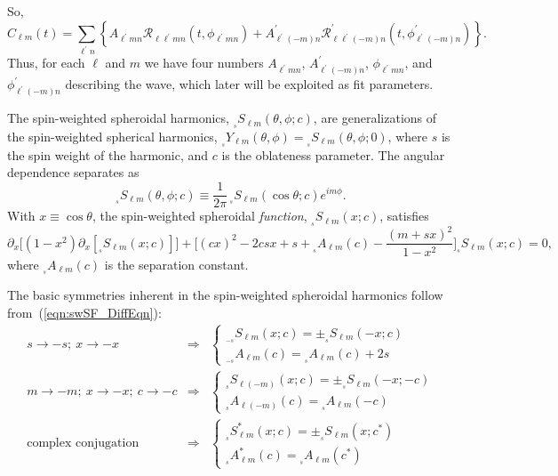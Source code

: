 \documentclass[11pt]{article}
\newcommand{\swY}[4][]{{}_{{}_{#2}}\!Y^{#1}_{#3}(#4)}
\newcommand{\swSH}[5][]{{}_{{}_{#2}}S^{#1}_{#3}(#4;#5)}
\newcommand{\swS}[5][]{{}_{{}_{#2}}S^{#1}_{#3}(#4;#5)}
\newcommand{\scA}[4][]{{}_{{}_{#2}}A^{#1}_{#3}(#4)}
\begin{document}
So,
\begin{equation}
 C_{\ell{m}}(t) = \sum_{\ell^\prime{n}} \left\{ 
   A_{\ell^\prime{m}n}\mathcal{R}_{\ell\ell^\prime{m}n}(t,\phi_{\ell^\prime{m}n})
  + A^\prime_{\ell^\prime(-m)n}
     \mathcal{R}^\prime_{\ell\ell^\prime(-m)n}(t,\phi^\prime_{\ell^\prime(-m)n})
     \right\}.
\end{equation}
Thus, for each $\ell$ and $m$ we have four numbers $A_{\ell^\prime{m}n}$, $A^\prime_{\ell^\prime(-m)n}$, $\phi_{\ell^\prime{m}n}$, and $\phi^\prime_{\ell^\prime(-m)n}$ describing the wave, which later will be exploited as fit parameters.

\newpage
{}
\vspace{0.25in}

The spin-weighted spheroidal harmonics,
$\swSH{s}{\ell{m}}{\theta,\phi}{c}$, are generalizations of the
spin-weighted spherical harmonics,
$\swY{s}{\ell{m}}{\theta,\phi}=\swSH{s}{\ell{m}}{\theta,\phi}{0}$,
where $s$ is the spin weight of the harmonic, and $c$ is the
oblateness parameter.  The angular dependence separates as
\begin{equation}
  \swSH{s}{\ell{m}}{\theta,\phi}{c} \equiv 
  \frac1{2\pi}\,\swS{s}{\ell{m}}{\cos\theta}{c}e^{im\phi}.
\end{equation}
With $x\equiv\cos\theta$, the spin-weighted spheroidal {\em function},
$\swS{s}{\ell{m}}{x}{c}$, satisfies
\begin{equation}\label{eqn:swSF_DiffEqn}
\partial_x \Big[ (1-x^2)\partial_x [\swS{s}{\ell{m}}{x}{c}]\Big] 
    + \bigg[(cx)^2 - 2 csx + s + \scA{s}{\ell m}{c} 
      - \frac{(m+sx)^2}{1-x^2}\bigg]\swS{s}{\ell{m}}{x}{c} = 0,
\end{equation}
where $\scA{s}{\ell m}{c}$ is the separation constant.

The basic symmetries inherent in the spin-weighted spheroidal harmonics
follow from~(\ref{eqn:swSF_DiffEqn}):
\begin{eqnarray}
s\rightarrow-s;\ x\rightarrow-x &\Rightarrow&
    \left\{\begin{array}{c}\swS{-s}{\ell{m}}{x}{c}=\pm\swS{s}{\ell{m}}{-x}{c} \\
        \scA{-s}{\ell{m}}{c} = \scA{s}{\ell{m}}{c} + 2s \end{array}\right. \\
m\rightarrow-m;\ x\rightarrow-x;\ c\rightarrow-c &\Rightarrow&
    \left\{\begin{array}{c}\swS{s}{\ell(-m)}{x}{c}=\pm\swS{s}{\ell{m}}{-x}{-c}\\
        \scA{s}{\ell(-m)}{c} = \scA{s}{\ell{m}}{-c} \end{array}\right. \\
\mbox{complex conjugation} &\Rightarrow&
    \left\{\begin{array}{c} \swS[*]{s}{\ell{m}}{x}{c}=\pm\swS{s}{\ell{m}}{x}{c^*} \\
        \scA[*]{s}{\ell{m}}{c} = \scA{s}{\ell{m}}{c^*} \end{array}\right.
\end{eqnarray}
\end{document}
